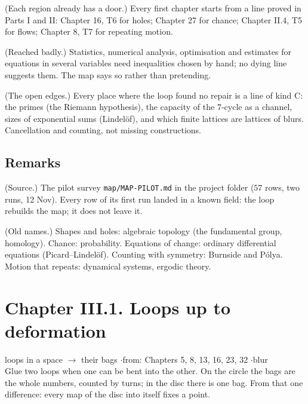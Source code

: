 \begin{lines}
\item[\lab{M1}] (Each region already has a door.) Every first chapter starts from a line proved in Parts I and II: Chapter 16, T6 for holes; Chapter 27 for chance; Chapter II.4, T5 for flows; Chapter 8, T7 for repeating motion.
\item[\lab{M2}] (Reached badly.) Statistics, numerical analysis, optimisation and estimates for equations in several variables need inequalities chosen by hand; no dying line suggests them. The map says so rather than pretending.
\item[\lab{M3}] (The open edges.) Every place where the loop found no repair is a line of kind C: the primes (the Riemann hypothesis), the capacity of the $7$-cycle as a channel, sizes of exponential sums (Lindel\"of), and which finite lattices are lattices of blurs. Cancellation and counting, not missing constructions.
\end{lines}

\subsection*{Remarks}

\begin{lines}
\item[\lab{R1}] (Source.) The pilot survey \texttt{map/MAP-PILOT.md} in the project folder ($57$ rows, two runs, 12 Nov). Every row of its first run landed in a known field: the loop rebuilds the map; it does not leave it.
\item[\lab{R2}] (Old names.) Shapes and holes: algebraic topology (the fundamental group, homology). Chance: probability. Equations of change: ordinary differential equations (Picard--Lindel\"of). Counting with symmetry: Burnside and P\'olya. Motion that repeats: dynamical systems, ergodic theory.
\end{lines}

\newpage

\section*{Chapter III.1. Loops up to deformation}
\begin{center}
{\normalsize loops in a space $\to$ their bags \quad$\cdot$\quad from: Chapters 5, 8, 13, 16, 23, 32 \quad$\cdot$\quad blur}\\[4pt]
{\small Glue two loops when one can be bent into the other. On the circle the bags are the whole numbers, counted by turns; in the disc there is one bag. From that one difference: every map of the disc into itself fixes a point.}
\end{center}

